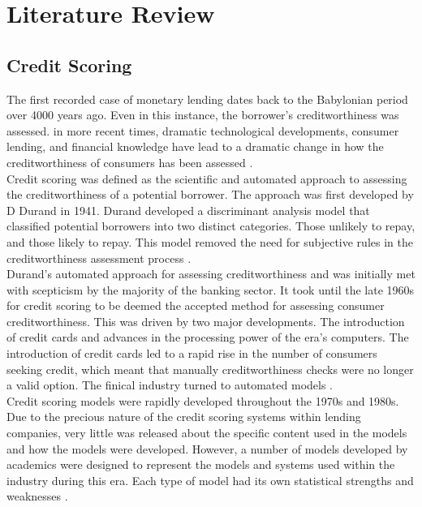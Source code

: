 \chapter{Literature Review} 
\label{Chapter2} 


\section{Credit Scoring}

The first recorded case of monetary lending dates back to the Babylonian period over 4000 years ago. Even in this instance, the borrower's creditworthiness was assessed. in more recent times, dramatic technological developments, consumer lending, and financial knowledge have lead to a dramatic change in how the creditworthiness of consumers has been assessed  \parencite{CreditScoringIntroLewis}. \\

Credit scoring was defined as the scientific and automated approach to assessing the creditworthiness of a potential borrower. The approach was first developed by D Durand in 1941. Durand developed a discriminant analysis model that classified potential borrowers into two distinct categories. Those unlikely to repay, and those likely to repay. This model removed the need for subjective rules in the creditworthiness assessment process \parencite{CreditScoringIntroThomas}. \\

Durand's automated approach for assessing creditworthiness and was initially met with scepticism by the majority of the banking sector. It took until the late 1960s for credit scoring to be deemed the accepted method for assessing consumer creditworthiness. This was driven by two major developments. The introduction of credit cards and advances in the processing power of the era's computers. The introduction of credit cards led to a rapid rise in the number of consumers seeking credit, which meant that manually creditworthiness checks were no longer a valid option. The finical industry turned to automated models \parencite{CreditScoringIntroMarquez}. \\

Credit scoring models were rapidly developed throughout the 1970s and 1980s. Due to the precious nature of the credit scoring systems within lending companies, very little was released about the specific content used in the models and how the models were developed.   However, a number of models developed by academics were designed to represent the models and systems used within the industry during this era. Each type of model had its own statistical strengths and weaknesses \parencite{CreditScoringReadings}. \\

